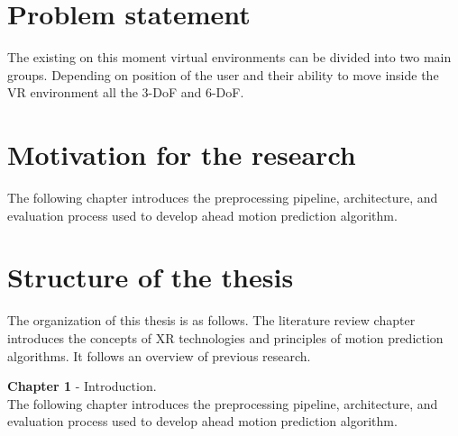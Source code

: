\section{Problem statement}
\label{sec:intro:problem}
The existing on this moment virtual environments can be divided into two main groups. Depending on position of the user and their ability to move inside the VR environment all the 3-DoF and 6-DoF. 

\section{Motivation for the research}
\label{sec:intro:motivation}
The following chapter introduces the preprocessing pipeline, architecture, and evaluation process used to develop ahead motion prediction algorithm.


\section{Structure of the thesis}
\label{sec:intro:structure}
The organization of this thesis is as follows. The literature review chapter introduces the concepts of XR technologies and principles of motion prediction algorithms. It follows an overview of previous research. 

\textbf{Chapter 1} - Introduction.\\
The following chapter introduces the preprocessing pipeline, architecture, and evaluation process used to develop ahead motion prediction algorithm.




